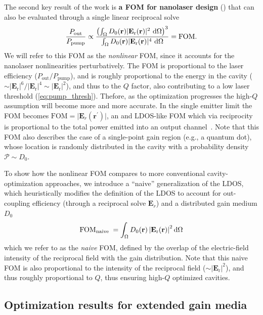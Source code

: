 The second key result of the work is \textbf{a FOM for nanolaser design} () that can also be evaluated through a single linear reciprocal solve~\cite{ownpub4}
\begin{equation}\label{eq:eff_nl}
    \frac{P_\text{out}}{P_\text{pump}} \propto \frac{\left( \int_{\Omega} D_0(\mathbf{r})|\mathbf{E}_{\text{r}}(\mathbf{r})|^2 \,  \mathop{}\!\text{d} \Omega \right)^3} {\int_{\Omega} D_0(\mathbf{r}) |\mathbf{E}_{\text{r}}(\mathbf{r})|^4 \,  \mathop{}\!\text{d} \Omega} = \text{FOM}.
\end{equation}
We will refer to this FOM as the \emph{nonlinear} FOM, since it accounts for the nanolaser nonlinearities perturbatively. The FOM is proportional to the laser efficiency ($P_\text{out}/P_\text{pump}$), and is roughly proportional 
to the energy in the cavity ($\sim |\mathbf{E}_{\text{r}}|^6 / |\mathbf{E}_{\text{r}}|^4 \sim |\mathbf{E}_{\text{r}}|^2$), and thus to the $Q$ factor, also contributing to a low
laser threshold (\eqref{eq:pump_thresh}). Thefore, as the optimization progresses the high-$Q$ assumption will become more and more accurate. In the single emitter limit the FOM becomes
$\text{FOM}=\vert \mathbf{E}_{r}(\mathbf{r}^\prime) \vert$, an
and LDOS-like FOM which via reciprocity is proportional to the total power emitted into an output channel~\cite[App.~C]{reci}. Note that this FOM also describes the case of a single-point gain region (e.g., a quantum dot),
whose location is randomly distributed in the cavity with a probability density $\mathcal{P} \sim D_0$. 

To show how the nonlinear FOM compares to more conventional cavity-optimization approaches, we introduce a “naive” generalization of the LDOS, which heuristically modifies the definition
of the LDOS to account for out-coupling efficiency (through a reciprocal solve $\mathbf{E}_r$) and a distributed gain
medium $D_0$
\begin{equation}\label{eq:SEL}
    \text{FOM}_{\text {naive }}=\int_{\Omega} D_0(\mathbf{r})\left|\mathbf{E}_{\text{r}}(\mathbf{r})\right|^2 \mathop{}\!\text{d} \Omega
\end{equation}
which we refer to as the \emph{naive} FOM, defined by the overlap of the electric-field intensity of the reciprocal field with the gain distribution.
Note that this naive FOM is also proportional to the intensity of the reciprocal field ($\sim |\mathbf{E}_{\text{r}}|^2$), and thus roughly proportional to $Q$, thus ensuring 
high-$Q$ optimized cavities.

\subsection*{Optimization results for extended gain media}

